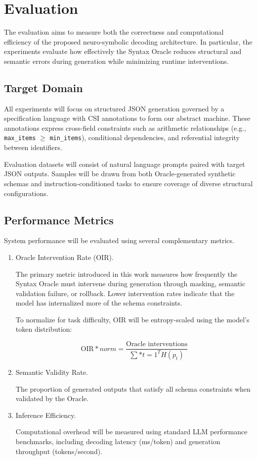 \section{Evaluation}

The evaluation aims to measure both the correctness and
computational efficiency of the proposed neuro-symbolic decoding
architecture. In particular, the experiments evaluate how effectively the
Syntax Oracle reduces structural and semantic errors during generation while
minimizing runtime interventions.

\subsection{Target Domain}
All experiments will focus on structured JSON generation governed by
a specification language with CSI annotations to form our abstract machine.
These annotations express cross-field constraints such as arithmetic relationships (e.g.,
\texttt{max\_items} $\geq$ \texttt{min\_items}), conditional dependencies,
and referential integrity between identifiers.

Evaluation datasets will consist of natural language prompts paired with
target JSON outputs. Samples will be drawn from both Oracle-generated
synthetic schemas and instruction-conditioned tasks to ensure coverage of
diverse structural configurations.

\subsection{Performance Metrics}
System performance will be evaluated using several complementary metrics.

\begin{enumerate}
\item Oracle Intervention Rate (OIR).

The primary metric introduced in this work measures how frequently the
Syntax Oracle must intervene during generation through masking, semantic
validation failure, or rollback. Lower intervention rates indicate that the
model has internalized more of the schema constraints.

To normalize for task difficulty, OIR will be entropy-scaled using the
model's token distribution:

\begin{equation}
\text{OIR}*{norm} =
\frac{\text{Oracle interventions}}
{\sum*{t=1}^{T} H(p_t)}
\end{equation}

\item Semantic Validity Rate.

The proportion of generated outputs that satisfy all schema constraints when
validated by the Oracle.

\item Inference Efficiency.

Computational overhead will be measured using standard LLM performance
benchmarks, including decoding latency (ms/token) and generation throughput
(tokens/second).
\end{enumerate}

